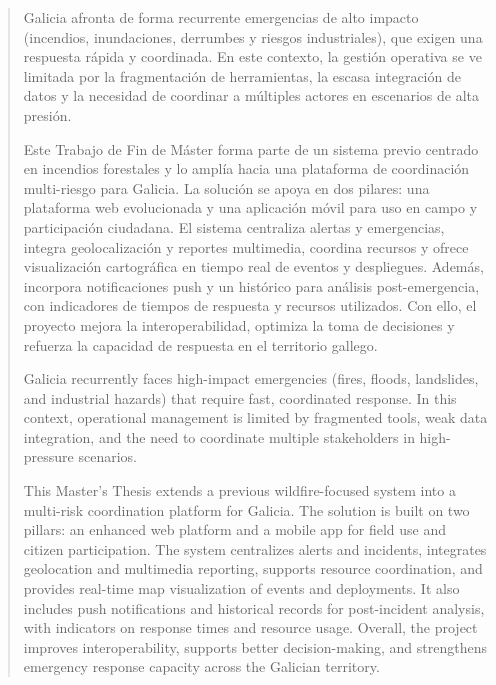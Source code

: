 
\begin{abstract}\thispagestyle{empty}

  Galicia afronta de forma recurrente emergencias de alto impacto (incendios, inundaciones, derrumbes y riesgos industriales), que exigen una respuesta rápida y coordinada. En este contexto, la gestión operativa se ve limitada por la fragmentación de herramientas, la escasa integración de datos y la necesidad de coordinar a múltiples actores en escenarios de alta presión.

  Este Trabajo de Fin de Máster forma parte de un sistema previo centrado en incendios forestales y lo amplía hacia una plataforma de coordinación multi-riesgo para Galicia. La solución se apoya en dos pilares: una plataforma web evolucionada y una aplicación móvil para uso en campo y participación ciudadana. El sistema centraliza alertas y emergencias, integra geolocalización y reportes multimedia, coordina recursos y ofrece visualización cartográfica en tiempo real de eventos y despliegues. Además, incorpora notificaciones push y un histórico para análisis post-emergencia, con indicadores de tiempos de respuesta y recursos utilizados. Con ello, el proyecto mejora la interoperabilidad, optimiza la toma de decisiones y refuerza la capacidad de respuesta en el territorio gallego.
  
  \vspace*{25pt}
  \begin{segundoresumo}
    Galicia recurrently faces high-impact emergencies (fires, floods, landslides, and industrial hazards) that require fast, coordinated response. In this context, operational management is limited by fragmented tools, weak data integration, and the need to coordinate multiple stakeholders in high-pressure scenarios.

    This Master’s Thesis extends a previous wildfire-focused system into a multi-risk coordination platform for Galicia. The solution is built on two pillars: an enhanced web platform and a mobile app for field use and citizen participation. The system centralizes alerts and incidents, integrates geolocation and multimedia reporting, supports resource coordination, and provides real-time map visualization of events and deployments. It also includes push notifications and historical records for post-incident analysis, with indicators on response times and resource usage. Overall, the project improves interoperability, supports better decision-making, and strengthens emergency response capacity across the Galician territory.
  \end{segundoresumo}
\vspace*{30pt}

\end{abstract}

